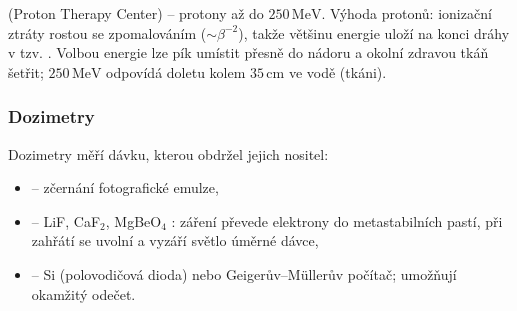  (Proton Therapy Center) – protony až do \(250\,\text{MeV}\).
Výhoda protonů: ionizační ztráty rostou se zpomalováním (\(\sim\beta^{-2}\)),
takže většinu energie uloží na konci dráhy v tzv. .
Volbou energie lze pík umístit přesně do nádoru a okolní zdravou tkáň
šetřit; \(250\,\text{MeV}\) odpovídá doletu kolem \(35\,\text{cm}\) ve vodě
(tkáni).

\subsubsection{Dozimetry}
Dozimetry měří dávku, kterou obdržel jejich nositel:
\begin{itemize}
  \item {} – zčernání fotografické emulze,
  \item {} – LiF, CaF\(_2\), MgBeO\(_4\)
  : záření převede elektrony do metastabilních pastí,
  při zahřátí se uvolní a vyzáří světlo úměrné dávce,
  \item {} – Si (polovodičová dioda) nebo Geigerův–Müllerův
  počítač; umožňují okamžitý odečet.
\end{itemize}

